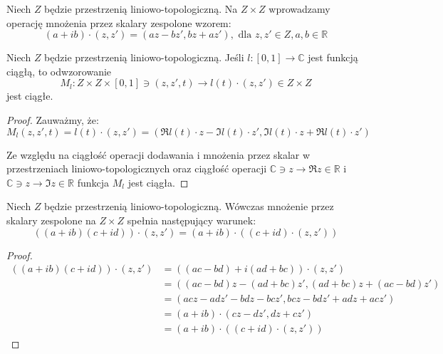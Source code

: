 \begin{df}
  Niech $Z$ będzie przestrzenią liniowo-topologiczną. Na $Z \times Z$ wprowadzamy operację mnożenia przez skalary zespolone wzorem:
  \[
    (a+ib) \cdot (z, z') = (az - bz', bz + az'),\mbox{ dla }z, z' \in Z, a,b \in \mathbb{R}
  \]
\end{df}

\begin{lem} \label{lem:mult-cont}
  Niech $Z$ będzie przestrzenią liniowo-topologiczną.
  Jeśli $l: [0,1] \rightarrow \mathbb{C}$ jest funkcją ciągłą, to odwzorowanie
  \[M_l: Z \times Z \times [0,1] \ni (z, z', t) \rightarrow l(t) \cdot (z, z') \in Z \times Z\]
  jest ciągłe.
  
  \begin{proof}
  Zauważmy, że:
  \[M_l(z, z', t) = l(t) \cdot(z, z') = (\Re{l(t)} \cdot z - \Im{l(t)} \cdot z', \Im{l(t)} \cdot z + \Re{l(t)} \cdot z')\]
  
  Ze względu na ciągłość operacji dodawania i mnożenia przez skalar w przestrzeniach liniowo-topologicznych oraz ciągłość operacji $\mathbb{C} \ni z \rightarrow \Re z \in \mathbb{R}$ i $\mathbb{C} \ni z \rightarrow \Im z \in \mathbb{R}$ funkcja $M_l$ jest ciągła.
  \end{proof}
\end{lem}

\begin{lem} \label{lem:mult-eq}
  Niech $Z$ będzie przestrzenią liniowo-topologiczną. Wówczas mnożenie przez skalary zespolone na $Z \times Z$ spełnia następujący warunek:
  \[((a + ib)(c + id)) \cdot (z, z') = (a + ib) \cdot ((c+id) \cdot (z, z'))\]
  
  \begin{proof}
    \begin{align*}
      ((a+ib)(c+id)) \cdot (z, z') &= ((ac - bd) + i(ad+bc)) \cdot (z, z') \\
      &= ((ac-bd)z - (ad+bc) z', (ad+bc)z + (ac-bd)z') \\
      &= (acz-adz' - bdz-bcz', bcz-bdz' + adz+acz') \\
      &= (a+ib) \cdot (cz -dz', dz + cz') \\
      &= (a+ib) \cdot ((c+id) \cdot (z,z'))
    \end{align*}

  \end{proof}
\end{lem}


